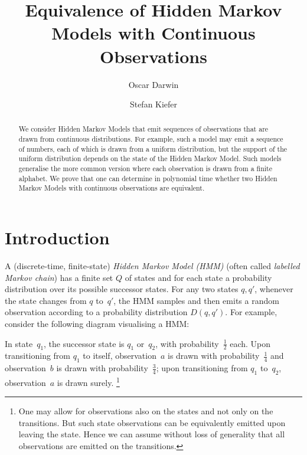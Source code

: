 \documentclass[a4paper,UKenglish,cleveref, autoref,mathscr]{lipics-v2019}
\title{Equivalence of Hidden Markov Models with Continuous Observations}
\author{Oscar Darwin}{Department of Computer Science, Oxford University, United Kingdom }{}{https://orcid.org/0000-0001-5016-014X}{}%
\author{Stefan Kiefer}{Department of Computer Science, Oxford University, United Kingdom}{}{https://orcid.org/0000-0003-4173-6877}{}
\newcommand{\1}{\mathbbm{1}}
\begin{document}
\maketitle

\begin{abstract}
We consider Hidden Markov Models that emit sequences of observations that are drawn from continuous distributions. For example, such a model may emit a sequence of numbers, each of which is drawn from a uniform distribution, but the support of the uniform distribution depends on the state of the Hidden Markov Model. Such models generalise the more common version where each observation is drawn from a finite alphabet. We prove that one can determine in polynomial time whether two Hidden Markov Models with continuous observations are equivalent.
\end{abstract}

\section{Introduction}

A (discrete-time, finite-state) \emph{Hidden Markov Model (HMM)} (often called \emph{labelled Markov chain}) has a finite set $Q$ of states and for each state a probability distribution over its possible successor states.
For any two states $q, q'$, whenever the state changes from $q$ to~$q'$, the HMM samples and then emits a random observation according to a probability distribution $D(q, q')$.
For example, consider the following diagram visualising a HMM:
\begin{center}
\end{center}
In state~$q_1$, the successor state is $q_1$ or~$q_2$, with probability~$\frac12$ each.
Upon transitioning from $q_1$ to itself, observation~$a$ is drawn with probability~$\frac14$ and observation~$b$ is drawn with probability~$\frac34$; upon transitioning from $q_1$ to~$q_2$, observation~$a$ is drawn surely.%
\footnote{One may allow for observations also on the states and not only on the transitions. But such state observations can be equivalently emitted upon leaving the state. Hence we can assume without loss of generality that all observations are emitted on the transitions.}
\end{document}
